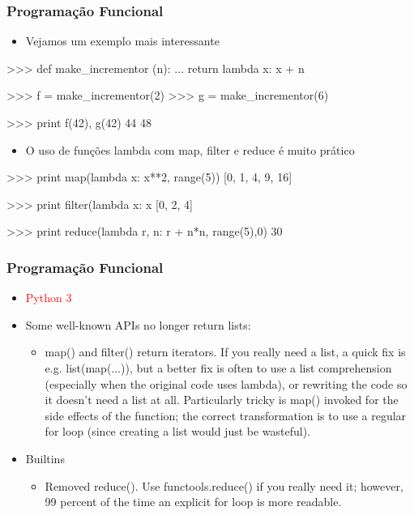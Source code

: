 \documentclass[12pt,t,graphics]{beamer}
\newcommand{\ft}[1]{\frametitle{#1}}
\newcommand{\bi}{\begin{itemize}}
\newcommand{\ei}{\end{itemize}}
\begin{document}

\begin{frame}[fragile]
  \ft{Programação Funcional}
  \bi
  \item Vejamos um exemplo mais interessante
  \ei 
  \begin{python}
>>> def make_incrementor (n): 
...     return lambda x: x + n

>>> f = make_incrementor(2)
>>> g = make_incrementor(6)

>>> print f(42), g(42)
44 48    
  \end{python}
  \bi
  \item O uso de funções lambda com map, filter e reduce
    é muito prático
  \ei
  \begin{python}
>>> print map(lambda x: x**2, range(5))
[0, 1, 4, 9, 16]

>>> print filter(lambda x: x %
[0, 2, 4]

>>> print reduce(lambda r, n: r + n*n, range(5),0)    
30
  \end{python}
\end{frame}


\begin{frame}[fragile]
  \ft{Programação Funcional}
  \vspace{-0.35cm}
  \bi
  \item \textcolor{red}{Python 3}
  \item Some well-known APIs no longer return lists:
    \bi
    \item map() and filter() return iterators. If you really need a list, a quick fix is e.g. list(map(...)), but a better fix is often to use a list comprehension (especially when the original code uses lambda), or rewriting the code so it doesn’t need a list at all. Particularly tricky is map() invoked for the side effects of the function; the correct transformation is to use a regular for loop (since creating a list would just be wasteful).
    \ei
    \item Builtins
    \bi
    \item Removed reduce(). Use functools.reduce() if you really need it; however, 99 percent of the time an explicit for loop is more readable.
    \ei
  \ei
\end{frame}

\end{document}
